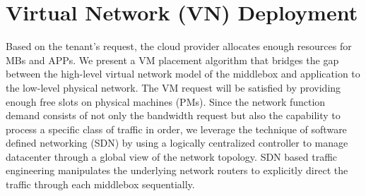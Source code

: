 \documentclass[review]{elsarticle}
\begin{document}

\section{Virtual Network (VN) Deployment}\label{sec:algorithm}
Based on the tenant's request, the cloud provider allocates enough resources for MBs and APPs.
We present a VM placement algorithm that bridges the gap between the high-level virtual network model of the middlebox and application to the low-level physical network. The VM request will be satisfied by providing enough free slots on physical machines (PMs). Since the network function demand consists of not only the bandwidth request but also the capability to process a specific class of traffic in order, we leverage the technique of software defined networking (SDN) by using a logically centralized controller to manage datacenter through a global view of the network topology. SDN based traffic engineering manipulates the underlying
network routers to explicitly direct the traffic through each
middlebox sequentially.

\end{document}

